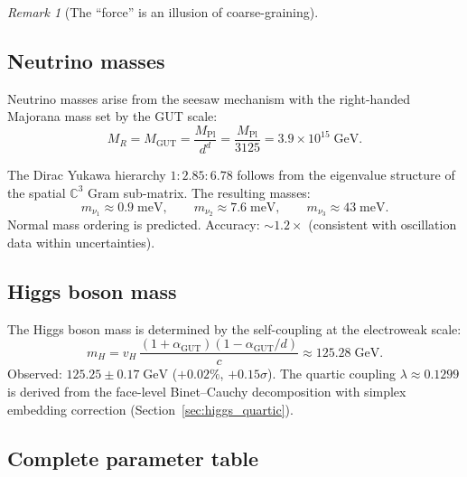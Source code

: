 \documentclass[12pt]{article}
\theoremstyle{remark}
\newtheorem{remark}[theorem]{Remark}
\theoremstyle{definition}
\newcommand{\CC}{\mathbb{C}}
\begin{document}
\begin{remark}[The ``force'' is an illusion of coarse-graining]
\subsection{Neutrino masses}

Neutrino masses arise from the seesaw mechanism with the right-handed Majorana mass set by the GUT scale:
\begin{equation}
M_R = M_\text{GUT} = \frac{M_\text{Pl}}{d^d} = \frac{M_\text{Pl}}{3125} = 3.9 \times 10^{15}\;\text{GeV}.
\end{equation}

The Dirac Yukawa hierarchy $1 : 2.85 : 6.78$ follows from the eigenvalue structure of the spatial $\CC^3$ Gram sub-matrix. The resulting masses:
\begin{equation}
m_{\nu_1} \approx 0.9\;\text{meV}, \qquad m_{\nu_2} \approx 7.6\;\text{meV}, \qquad m_{\nu_3} \approx 43\;\text{meV}.
\end{equation}
Normal mass ordering is predicted. Accuracy: $\sim 1.2\times$ (consistent with oscillation data within uncertainties).

\subsection{Higgs boson mass}

The Higgs boson mass is determined by the self-coupling at the electroweak scale:
\begin{equation}
m_H = v_H\,\frac{(1+\alpha_\text{GUT})(1-\alpha_\text{GUT}/d)}{c} \approx 125.28\;\text{GeV}.
\end{equation}
Observed: $125.25 \pm 0.17\;\text{GeV}$ ($+0.02\%$, $+0.15\sigma$).  The quartic coupling $\lambda \approx 0.1299$ is derived from the face-level Binet--Cauchy decomposition with simplex embedding correction (Section~\ref{sec:higgs_quartic}).

\subsection{Complete parameter table}


\end{remark}
\end{document}
